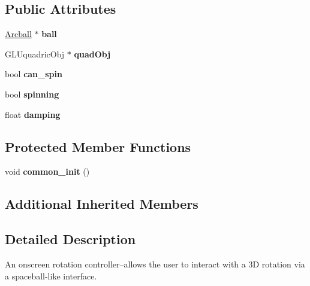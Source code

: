 \subsection*{Public Attributes}
\begin{DoxyCompactItemize}
\item 
\hypertarget{classGLUI__Rotation_ae57cc59ce48aec071b5db4fe608b98b3}{\hyperlink{classArcball}{Arcball} $\ast$ {\bfseries ball}}\label{classGLUI__Rotation_ae57cc59ce48aec071b5db4fe608b98b3}

\item 
\hypertarget{classGLUI__Rotation_af98f7b7cec5463b46b3ba1f685ef142c}{G\-L\-Uquadric\-Obj $\ast$ {\bfseries quad\-Obj}}\label{classGLUI__Rotation_af98f7b7cec5463b46b3ba1f685ef142c}

\item 
\hypertarget{classGLUI__Rotation_abb7e1e037705d27ac91805ac21ddbd39}{bool {\bfseries can\-\_\-spin}}\label{classGLUI__Rotation_abb7e1e037705d27ac91805ac21ddbd39}

\item 
\hypertarget{classGLUI__Rotation_a49f0172a0fe24adb308730664f083018}{bool {\bfseries spinning}}\label{classGLUI__Rotation_a49f0172a0fe24adb308730664f083018}

\item 
\hypertarget{classGLUI__Rotation_a3164bbd01acc6e91b845c72df6987a51}{float {\bfseries damping}}\label{classGLUI__Rotation_a3164bbd01acc6e91b845c72df6987a51}

\end{DoxyCompactItemize}
\subsection*{Protected Member Functions}
\begin{DoxyCompactItemize}
\item 
\hypertarget{classGLUI__Rotation_af6715a13b59b945ea1635a01a0a62aa6}{void {\bfseries common\-\_\-init} ()}\label{classGLUI__Rotation_af6715a13b59b945ea1635a01a0a62aa6}

\end{DoxyCompactItemize}
\subsection*{Additional Inherited Members}


\subsection{Detailed Description}
An onscreen rotation controller--allows the user to interact with a 3\-D rotation via a spaceball-\/like interface. 

